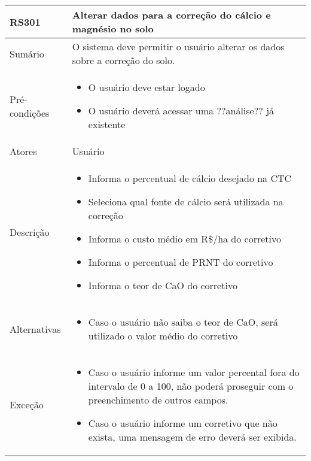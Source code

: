 \begin{quadro}[H]
    \begin{tabular}{|p{3cm}|p{11cm}|}
        \hline
        \textbf{RS301} & \textbf{Alterar dados para a correção do cálcio e magnésio no solo}          \\
        \hline
        Sumário        & O sistema deve permitir o usuário alterar os dados sobre a correção do solo. \\
        \hline
        Pré-condições  & \begin{itemize}
            \item O usuário deve estar logado
            \item O usuário deverá acessar uma ??análise?? já existente
        \end{itemize}                                                    \\
        \hline
        Atores         & Usuário                                                                      \\
        \hline
        Descrição      &
        \begin{itemize}
            \item Informa o percentual de cálcio desejado na CTC
            \item Seleciona qual fonte de cálcio será utilizada na correção
            \item Informa o custo médio em R\$/ha do corretivo
            \item Informa o percentual de PRNT do corretivo
            \item Informa o teor de CaO do corretivo
        \end{itemize}                                                                     \\
        \hline
        Alternativas   &
        \begin{itemize}
            \item Caso o usuário não saiba o teor de CaO, será utilizado o valor médio do corretivo
        \end{itemize}                                                                     \\
        \hline
        Exceção        &
        \begin{itemize}
            \item Caso o usuário informe um valor percental fora do intervalo de 0 a 100, não poderá proseguir com o preenchimento de outros campos.
            \item Caso o usuário informe um corretivo que não exista, uma mensagem de erro deverá ser exibida.
        \end{itemize}                                                                     \\
        \hline
    \end{tabular}
\end{quadro}

